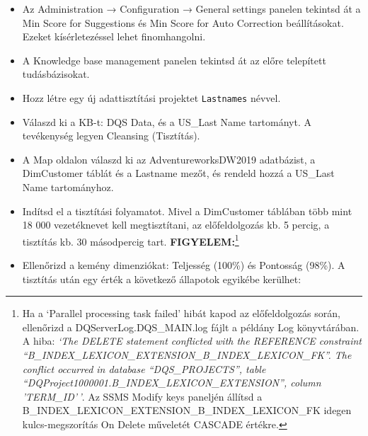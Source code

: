 \documentclass[
  magyar,
]{article}
\providecommand{\tightlist}{%
  \setlength{\itemsep}{0pt}\setlength{\parskip}{0pt}}
\begin{document}
\begin{itemize}
\tightlist
\item
  Az Administration → Configuration → General settings panelen tekintsd
  át a Min Score for Suggestions és Min Score for Auto Correction
  beállításokat. Ezeket kísérletezéssel lehet finomhangolni.
\item
  A Knowledge base management panelen tekintsd át az előre telepített
  tudásbázisokat.
\item
  Hozz létre egy új adattisztítási projektet \texttt{Lastnames} névvel.
\item
  Válaszd ki a KB-t: DQS Data, és a US\_Last Name tartományt. A
  tevékenység legyen Cleansing (Tisztítás).
\item
  A Map oldalon válaszd ki az AdventureworksDW2019 adatbázist, a
  DimCustomer táblát és a Lastname mezőt, és rendeld hozzá a US\_Last
  Name tartományhoz.
\item
  Indítsd el a tisztítási folyamatot. Mivel a DimCustomer táblában több
  mint 18 000 vezetéknevet kell megtisztítani, az előfeldolgozás kb. 5
  percig, a tisztítás kb. 30 másodpercig tart.
  \textbf{FIGYELEM:}\footnote{Ha a `Parallel processing task failed'
    hibát kapod az előfeldolgozás során, ellenőrizd a
    DQServerLog.DQS\_MAIN.log fájlt a példány Log könyvtárában. A hiba:
    \emph{`The DELETE statement conflicted with the REFERENCE constraint
    ``B\_INDEX\_LEXICON\_EXTENSION\_B\_INDEX\_LEXICON\_FK''. The
    conflict occurred in database ``DQS\_PROJECTS'', table
    ``DQProject1000001.B\_INDEX\_LEXICON\_EXTENSION'', column
    'TERM\_ID'\,'}. Az SSMS Modify keys paneljén állítsd a
    B\_INDEX\_LEXICON\_EXTENSION\_B\_INDEX\_LEXICON\_FK idegen
    kulcs-megszorítás On Delete műveletét CASCADE értékre.}
\item
  Ellenőrizd a kemény dimenziókat: Teljesség (100\%) és Pontosság
  (98\%). A tisztítás után egy érték a következő állapotok egyikébe
  kerülhet:


\end{itemize}
\end{document}
